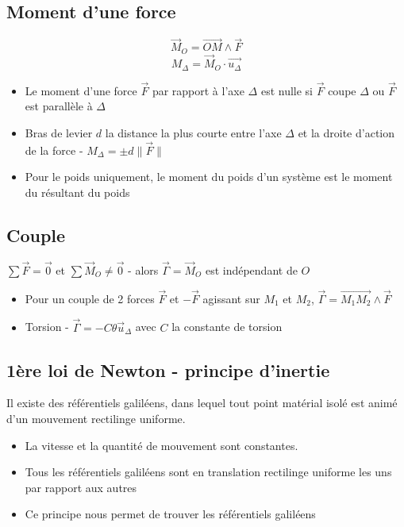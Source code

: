 \documentclass[openany]{book}
\begin{document}
\subsection{Moment d'une force}
\[ \vec{M}_O = \overrightarrow{OM} \wedge \vec{F} \]
\[ M_\Delta = \vec{M}_O \cdot \vec{u_\Delta} \]

\begin{itemize}
    \item Le moment d'une force $\vec{F}$ par rapport à l'axe $ \Delta $ est nulle si $\vec{F}$ coupe $\Delta$ ou $\vec{F}$ est parallèle à $\Delta$
    \item Bras de levier $d$ la distance la plus courte entre l'axe $\Delta$ et la droite d'action de la force - $M_\Delta = \pm d \| \vec{F} \| $
    \item Pour le poids uniquement, le moment du poids d'un système est le moment du résultant du poids
\end{itemize}

\subsection{Couple}
$\sum \vec{F} = \vec{0}$ et $\sum \vec{M}_O \neq \vec{0}$ - alors $\vec{\Gamma} = \vec{M}_O$ est indépendant de $O$

\begin{itemize}
    \item Pour un couple de 2 forces $\vec{F}$ et $-\vec{F}$ agissant sur $M_1$ et $M_2$, $\vec{\Gamma} = \overrightarrow{M_1M_2} \wedge \vec{F}$
    \item Torsion - $\vec{\Gamma} = -C\theta \vec{u}_\Delta$ avec $C$ la constante de torsion
\end{itemize}

\subsection{1ère loi de Newton - principe d'inertie}
Il existe des référentiels galiléens, dans lequel tout point matérial isolé est animé d'un mouvement rectilinge uniforme.
\begin{itemize}
    \item La vitesse et la quantité de mouvement sont constantes.
    \item Tous les référentiels galiléens sont en translation rectilinge uniforme les uns par rapport aux autres
    \item Ce principe nous permet de trouver les référentiels galiléens
\end{itemize}
\end{document}
